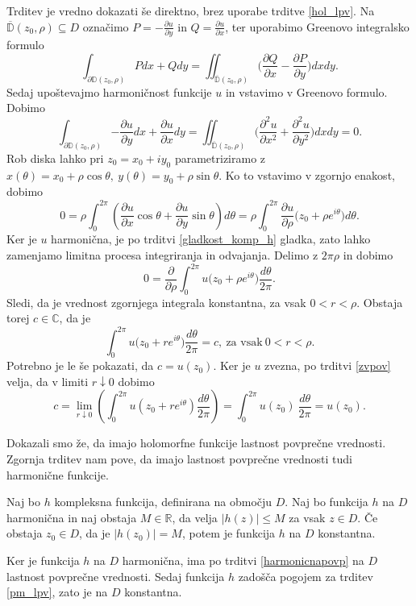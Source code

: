 \documentclass[mat1, tisk]{fmfdelo}
\begin{document}
\begin{dokaz}
        Trditev je vredno dokazati še direktno, brez uporabe trditve \ref{hol_lpv}.
        Na $\overline{\mathbb{D}}(z_0, \rho) \subseteq D$ označimo $P = -\frac{\partial u}{\partial y}$ in $Q = \frac{\partial u}{\partial x}$, ter uporabimo Greenovo integralsko formulo
        $$
            \int_{\partial \mathbb{D}(z_0, \rho)}{P dx + Q dy} = \iint_{\overline{\mathbb{D}}(z_0, \rho)}{\bigg(\frac{\partial Q}{\partial x} - \frac{\partial P}{\partial y}\bigg)dx dy}.
        $$ 
        Sedaj upoštevajmo harmoničnost funkcije $u$ in vstavimo v Greenovo formulo. Dobimo
        $$
        \int_{\partial \mathbb{D}(z_0, \rho)}{-\frac{\partial u}{\partial y} dx + \frac{\partial u}{\partial x} dy} = \iint_{\overline{\mathbb{D}}(z_0, \rho)}{\bigg(\frac{\partial^2 u}{\partial x^2} + \frac{\partial^2 u}{\partial y^2}\bigg)dx dy} = 0. 
        $$
        Rob diska lahko pri $z_0 = x_0 + iy_0$ parametriziramo z $x(\theta) = x_0 + \rho \cos\theta,~y(\theta) = y_0 + \rho \sin\theta$. Ko to vstavimo v zgornjo enakost, dobimo
        $$
        0 = \rho \int_{0}^{2 \pi}{\left(\frac{\partial u}{\partial x} \cos\theta + \frac{\partial u}{\partial y} \sin\theta\right) d\theta} = \rho \int_{0}^{2\pi}{\frac{\partial u}{\partial \rho}\big(z_0 + \rho e^{i\theta}\big)d\theta}.
        $$
        Ker je $u$ harmonična, je po trditvi \ref{gladkost_komp_h} gladka, zato lahko zamenjamo limitna procesa integriranja in odvajanja. Delimo z $2\pi \rho$ in dobimo
        $$
        0 = \frac{\partial}{\partial \rho} \int_{0}^{2\pi}{u\big(z_0 + \rho e^{i\theta}\big)\frac{d\theta}{2 \pi}}.
        $$
        Sledi, da je vrednost zgornjega integrala konstantna, za vsak $0 <r < \rho$. Obstaja torej $c \in \mathbb{C}$, da je
        $$
        \int_{0}^{2\pi}{u\big(z_0 + r e^{i\theta}\big)\frac{d\theta}{2 \pi}} = c,~\text{za vsak}~ 0 < r < \rho.
        $$
        Potrebno je le še pokazati, da $c = u(z_0)$.
        Ker je $u$ zvezna, po trditvi \ref{zvpov} velja, da v limiti $r \downarrow 0$ dobimo
        $$
        c = \lim_{r \downarrow 0}{\left(\int_{0}^{2\pi}{u\left(z_0 + r e^{i\theta}\right)\frac{d\theta}{2 \pi}}\right)} = \int_{0}^{2\pi}{{u(z_0)~\frac{d\theta}{2 \pi}}} = u(z_0).
        $$
    \end{dokaz}

    Dokazali smo že, da imajo holomorfne funkcije lastnost povprečne vrednosti. Zgornja trditev nam pove, da imajo lastnost povprečne vrednosti tudi harmonične funkcije.

    \begin{posledica}
        \label{pm_harm}
        Naj bo $h$ kompleksna funkcija, definirana na območju $D$. Naj bo funkcija $h$ na $D$ harmonična in naj obstaja $M \in \mathbb{R}$, da velja $|h(z)| \leq M$ za vsak $z \in D$. 
        Če obstaja $z_0 \in D$, da je $|h(z_0)| = M$, potem je funkcija $h$ na $D$ konstantna.  
    \end{posledica}
    \begin{dokaz}
        Ker je funkcija $h$ na $D$ harmonična, ima po trditvi \ref{harmonicnapovp} na $D$ lastnost povprečne vrednosti. Sedaj funkcija $h$ zadošča pogojem za trditev \ref{pm_lpv}, zato je na $D$ konstantna.
    \end{dokaz}
\end{document}
